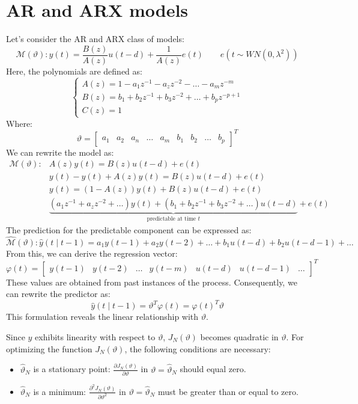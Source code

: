 \section{AR and ARX models}

Let's consider the AR and ARX class of models:
\[\mathcal{M}(\vartheta): y(t)=\dfrac{B(z)}{A(z)}u(t-d)+\dfrac{1}{A(z)}e(t)\qquad e(t \sim WN(0,\lambda^2))\]
Here, the polynomials are defined as:
\[\begin{cases}
    A(z)=1-a_1z^{-1}-a_zz^{-2}-\dots-a_mz^{-m} \\
    B(z)=b_1+b_2z^{-1}+b_3z^{-2}+\dots+b_pz^{-p+1} \\
    C(z)=1
\end{cases}\]
Where: 
\[\vartheta=\begin{bmatrix}
    a_1 & a_2 & a_n & \dots & a_m & b_1 & b_2 & \dots & b_p
\end{bmatrix}^T\]
We can rewrite the model as:
\begin{align*}
    \mathcal{M}(\vartheta): &A(z)y(t)=B(z)u(t-d)+e(t) \\
                            &y(t)-y(t)+A(z)y(t)=B(z)u(t-d)+e(t) \\
                            &y(t)=(1-A(z))y(t)+B(z)u(t-d)+e(t) \\
                            &\underbrace{\left(a_1z^{-1}+a_zz^{-2}+\dots\right)y(t) + \left(b_1+b_2z^{-1}+b_3z^{-2}+\dots\right)u(t-d)}_{\text{predictable at time } t} +e(t)
\end{align*}
The prediction for the predictable component can be expressed as:
\[\hat{\mathcal{M}}(\vartheta):\hat{y}(t\mid t-1)=a_1y(t-1)+a_2y(t-2)+\dots+b_1u(t-d)+b_2u(t-d-1)+\dots\]
From this, we can derive the regression vector:
\[\varphi(t)=\begin{bmatrix}
    y(t-1) & y(t-2) & \dots & y(t-m) & u(t-d) & u(t-d-1) & \dots
\end{bmatrix}^T\]
These values are obtained from past instances of the process. 
Consequently, we can rewrite the predictor as:
\[\hat{y}(t\mid t-1)=\vartheta^T\varphi(t)=\varphi(t)^T\vartheta\]
This formulation reveals the linear relationship with $\vartheta$.

Since $\hat{y}$ exhibits linearity with respect to $\vartheta$, $J_N(\vartheta)$ becomes quadratic in $\vartheta$. 
For optimizing the function $J_N(\vartheta)$, the following conditions are necessary:
\begin{itemize}
    \item $\hat{\vartheta}_N$ is a stationary point: $\frac{\partial J_N(\vartheta)}{\partial\vartheta}$ in $\vartheta=\hat{\vartheta}_N$ should equal zero.
    \item $\hat{\vartheta}_N$ is a minimum: $\frac{\partial^2 J_N(\vartheta)}{\partial\vartheta^2}$ in $\vartheta=\hat{\vartheta}_N$ must be greater than or equal to zero.
\end{itemize}

